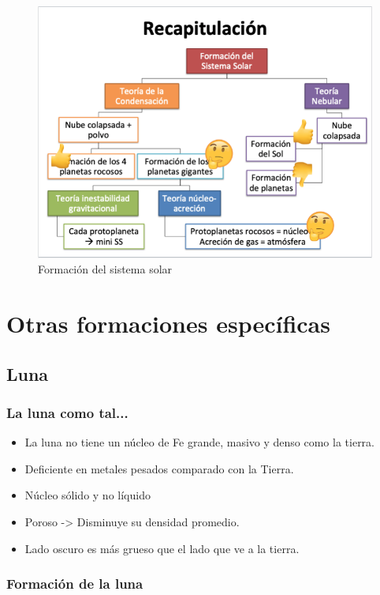 \documentclass[11pt,fleqn]{book} %
\begin{document}
\begin{figure}[h]
\centering\includegraphics[scale=0.6]{Pictures/ss_formacion}
\caption{Formación del sistema solar}
\label{fig:placeholder} 
\end{figure}

\chapter{Otras formaciones específicas}
\section{Luna}

\subsection{La luna como tal...}
\begin{itemize}
    \item La luna no tiene un núcleo de Fe grande, masivo y denso como la tierra. 
    \item Deficiente en metales pesados comparado con la Tierra. 
    \item Núcleo sólido y no líquido
    \item Poroso -> Disminuye su densidad promedio. 
    \item Lado oscuro es más grueso que el lado que ve a la tierra. 
\end{itemize}

\subsection{Formación de la luna}
\end{document}
